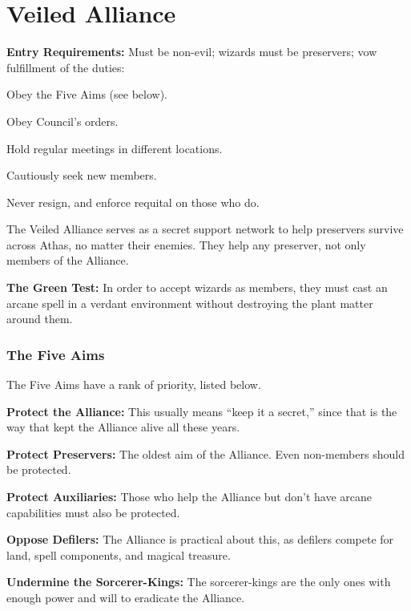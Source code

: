 \section{Veiled Alliance}

\textbf{Entry Requirements:} Must be non-evil; wizards must be preservers; vow fulfillment of the duties:
\begin{itemize*}
	\item Obey the Five Aims (see below).
	\item Obey Council's orders.
	\item Hold regular meetings in different locations.
	\item Cautiously seek new members.
	\item Never resign, and enforce requital on those who do.
\end{itemize*}

The Veiled Alliance serves as a secret support network to help preservers survive across Athas, no matter their enemies. They help any preserver, not only members of the Alliance.

\textbf{The Green Test:} In order to accept wizards as members, they must cast an arcane spell in a verdant environment without destroying the plant matter around them.



\subsubsection{The Five Aims}
The Five Aims have a rank of priority, listed below.

\begin{enumerate*}
	\item \textbf{Protect the Alliance:} This usually means ``keep it a secret,'' since that is the way that kept the Alliance alive all these years. 
	\item \textbf{Protect Preservers:} The oldest aim of the Alliance. Even non-members should be protected.
	\item \textbf{Protect Auxiliaries:} Those who help the Alliance but don't have arcane capabilities must also be protected.
	\item \textbf{Oppose Defilers:} The Alliance is practical about this, as defilers compete for land, spell components, and magical treasure.
	\item \textbf{Undermine the Sorcerer-Kings:} The sorcerer-kings are the only ones with enough power and will to eradicate the Alliance.
\end{enumerate*}



